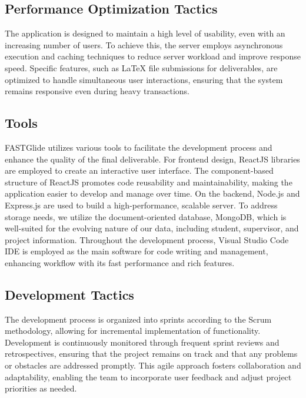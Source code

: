 \documentclass{FastFyp}
\begin{document}
\subsection{Performance Optimization Tactics}
The application is designed to maintain a high level of usability, even with an increasing number of users.
To achieve this, the server employs asynchronous execution and caching techniques to reduce server workload and improve response speed.
Specific features, such as LaTeX file submissions for deliverables, are optimized to handle simultaneous user interactions, ensuring that the system remains responsive even during heavy transactions.

\subsection{Tools}
FASTGlide utilizes various tools to facilitate the development process and enhance the quality of the final deliverable.
For frontend design, ReactJS libraries are employed to create an interactive user interface. The component-based structure of ReactJS promotes code reusability and maintainability, making the application easier to develop and manage over time.
On the backend, Node.js and Express.js are used to build a high-performance, scalable server.
To address storage needs, we utilize the document-oriented database, MongoDB, which is well-suited for the evolving nature of our data, including student, supervisor, and project information.
Throughout the development process, Visual Studio Code IDE is employed as the main software for code writing and management, enhancing workflow with its fast performance and rich features.

\subsection{Development Tactics}
The development process is organized into sprints according to the Scrum methodology, allowing for incremental implementation of functionality.
Development is continuously monitored through frequent sprint reviews and retrospectives, ensuring that the project remains on track and that any problems or obstacles are addressed promptly.
This agile approach fosters collaboration and adaptability, enabling the team to incorporate user feedback and adjust project priorities as needed.
\end{document}
